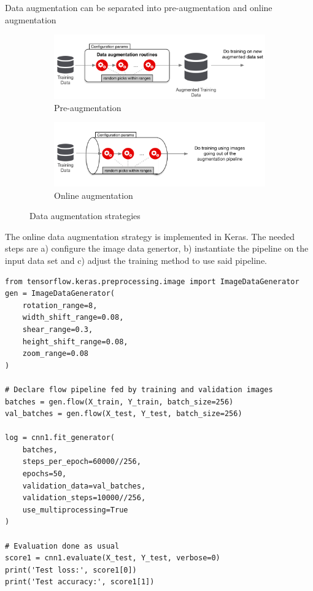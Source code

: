 \documentclass[11pt]{article}
\begin{document}
Data augmentation can be separated into pre-augmentation and online augmentation
\begin{figure}[H]
	\begin{subfigure}[t]{\linewidth}
		\includegraphics[width=\linewidth]{img/data_augmentation_pre}
		\caption{Pre-augmentation}
	\end{subfigure}
	\begin{subfigure}[b]{\linewidth}
		\includegraphics[width=\linewidth]{img/data_augmentation_online}
		\caption{Online augmentation}
	\end{subfigure}
	\caption{Data augmentation strategies}
\end{figure}

The online data augmentation strategy is implemented in Keras. The needed steps are a) configure the image data genertor, b) instantiate the pipeline on the input data set and c) adjust the training method to use said pipeline.
\begin{verbatim}
from tensorflow.keras.preprocessing.image import ImageDataGenerator
gen = ImageDataGenerator(
	rotation_range=8,
	width_shift_range=0.08,
	shear_range=0.3,
	height_shift_range=0.08,
	zoom_range=0.08
)

# Declare flow pipeline fed by training and validation images
batches = gen.flow(X_train, Y_train, batch_size=256)
val_batches = gen.flow(X_test, Y_test, batch_size=256)

log = cnn1.fit_generator(
	batches,
	steps_per_epoch=60000//256,
	epochs=50,
	validation_data=val_batches,
	validation_steps=10000//256,
	use_multiprocessing=True
)

# Evaluation done as usual
score1 = cnn1.evaluate(X_test, Y_test, verbose=0)
print('Test loss:', score1[0])
print('Test accuracy:', score1[1])
\end{verbatim}
\end{document}
